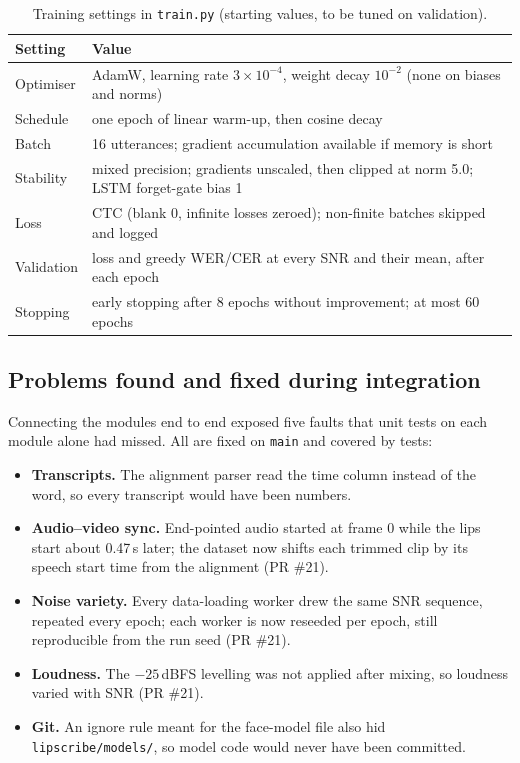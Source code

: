 \documentclass[11pt,a4paper]{article}
\newcommand{\code}[1]{\texttt{\small #1}}
\begin{document}
\begin{table}[htbp]
\centering\small
\caption{Training settings in \code{train.py} (starting values, to be tuned on validation).}
\label{tab:hparams}
\begin{tabularx}{\textwidth}{@{}L{4.3cm}X@{}}
\toprule
{}\sffamily\bfseries Setting & \sffamily\bfseries Value \\
\midrule
Optimiser & AdamW, learning rate $3\times10^{-4}$, weight decay $10^{-2}$ (none on biases and norms) \\
Schedule & one epoch of linear warm-up, then cosine decay \\
Batch & 16 utterances; gradient accumulation available if memory is short \\
Stability & mixed precision; gradients unscaled, then clipped at norm 5.0; LSTM forget-gate bias 1 \\
Loss & CTC (blank 0, infinite losses zeroed); non-finite batches skipped and logged \\
Validation & loss and greedy WER/CER at every SNR and their mean, after each epoch \\
Stopping & early stopping after 8 epochs without improvement; at most 60 epochs \\
\bottomrule
\end{tabularx}
\end{table}

\subsection{Problems found and fixed during integration}
Connecting the modules end to end exposed five faults that unit tests on each
module alone had missed. All are fixed on \code{main} and covered by tests:
\begin{itemize}
  \item \textbf{Transcripts.} The alignment parser read the time column instead
        of the word, so every transcript would have been numbers.
  \item \textbf{Audio--video sync.} End-pointed audio started at frame 0 while
        the lips start about 0.47\,s later; the dataset now shifts each trimmed
        clip by its speech start time from the alignment (PR \#21).
  \item \textbf{Noise variety.} Every data-loading worker drew the same SNR
        sequence, repeated every epoch; each worker is now reseeded per epoch,
        still reproducible from the run seed (PR \#21).
  \item \textbf{Loudness.} The $-25$\,dBFS levelling was not applied after
        mixing, so loudness varied with SNR (PR \#21).
  \item \textbf{Git.} An ignore rule meant for the face-model file also hid
        \code{lipscribe/models/}, so model code would never have been committed.
\end{itemize}
\end{document}
